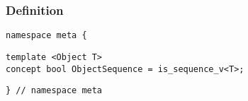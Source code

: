 
\subsubsection{Definition}

\begin{verbatim}
namespace meta {
\end{verbatim}
\begin{verbatim}
template <Object T>
concept bool ObjectSequence = is_sequence_v<T>;

\end{verbatim}
\begin{verbatim}
} // namespace meta
\end{verbatim}
